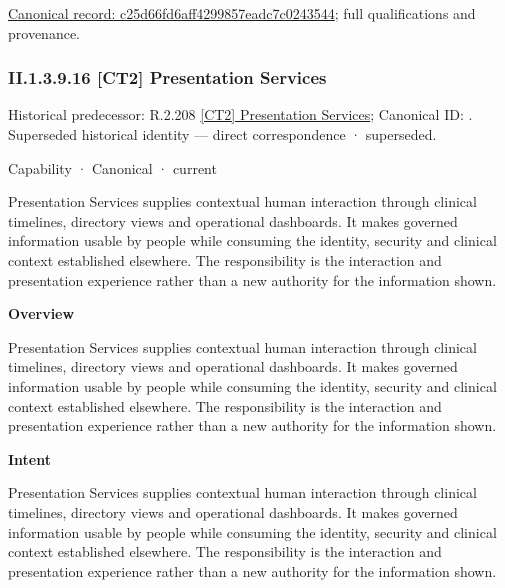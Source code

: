 {\footnotesize \href{../../../../continuum/strategy/capability/feature/c25d66fd6aff4299857eadc7c0243544.md}{Canonical record: c25d66fd6aff4299857eadc7c0243544}; full qualifications and provenance.}\par
\subsubsection*{II.1.3.9.16 [CT2] Presentation Services}
\label{navigation:II.1.3.9.16}

{\small Historical predecessor: R.2.208 \hyperref[element:c89e7c8b277247d9965fdb534aad2d1f]{[CT2] Presentation Services}; Canonical ID: \texttt{}. Superseded historical identity — direct correspondence · superseded.}\par
\label{element:e9b6ba1917ba44cca7466444d0836c98}
{\small Capability · Canonical · current}\par

Presentation Services supplies contextual human interaction through clinical timelines, directory views and operational dashboards. It makes governed information usable by people while consuming the identity, security and clinical context established elsewhere. The responsibility is the interaction and presentation experience rather than a new authority for the information shown.



\textbf{Overview}



Presentation Services supplies contextual human interaction through clinical timelines, directory views and operational dashboards. It makes governed information usable by people while consuming the identity, security and clinical context established elsewhere. The responsibility is the interaction and presentation experience rather than a new authority for the information shown.



\textbf{Intent}



Presentation Services supplies contextual human interaction through clinical timelines, directory views and operational dashboards. It makes governed information usable by people while consuming the identity, security and clinical context established elsewhere. The responsibility is the interaction and presentation experience rather than a new authority for the information shown.




